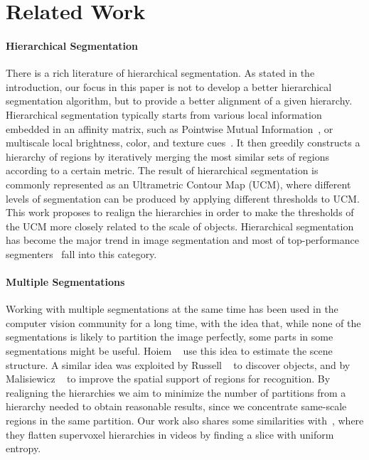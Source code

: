 \section{Related Work}
\label{sec:related}
\paragraph{Hierarchical Segmentation}
There is a rich literature of hierarchical segmentation.
As stated in the introduction, our focus in this paper is not to develop a better hierarchical
segmentation algorithm, but to provide a better alignment of a given hierarchy. 
Hierarchical segmentation typically starts from various local information embedded in an affinity matrix,
such as Pointwise Mutual Information~\cite{isola2014crisp}, or multiscale local brightness, color, and texture cues~\cite{arbelaez2011contour}.
It then greedily constructs a hierarchy of regions by iteratively merging the most similar sets of regions
according to a certain metric. 
The result of hierarchical segmentation is commonly represented as an Ultrametric Contour Map (UCM),
where different levels of segmentation can be produced by applying different thresholds to UCM.
This work proposes to realign the hierarchies in order to make the thresholds of the UCM more closely related
to the scale of objects.
Hierarchical segmentation has become the major trend in image segmentation and most of top-performance segmenters~\cite{arbelaez2011contour,arbelaez2014multiscale,Ren2013,kim2013learning} fall into this category. 

\paragraph{Multiple Segmentations}
Working with multiple segmentations at the same time has been used in the computer vision community
for a long time, with the idea that, while none of the segmentations is likely to partition the image perfectly, some parts in some segmentations might be useful.
Hoiem \etal~\cite{hoiem2005geometric} use this idea to estimate the scene structure.
A similar idea was exploited by Russell \etal~\cite{russell2006using} to discover objects,
and by Malisiewicz \etal~\cite{malisiewicz2007improving} to improve the spatial support of regions for
recognition.
By realigning the hierarchies we aim to minimize the number of partitions from a hierarchy needed to obtain
reasonable results, since we concentrate same-scale regions in the same partition.
Our work also shares some similarities with~\cite{xu2013flattening}, where they flatten supervoxel
hierarchies in videos by finding a slice with uniform entropy.

